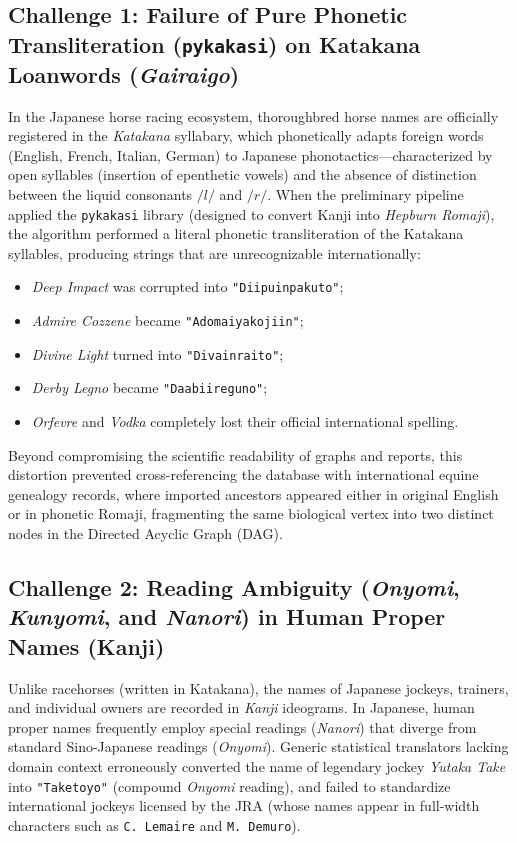 \documentclass[12pt,a4paper]{article}
\begin{document}
\subsection{Challenge 1: Failure of Pure Phonetic Transliteration (\texttt{pykakasi}) on Katakana Loanwords (\textit{Gairaigo})}
In the Japanese horse racing ecosystem, thoroughbred horse names are officially registered in the \textit{Katakana} syllabary, which phonetically adapts foreign words (English, French, Italian, German) to Japanese phonotactics---characterized by open syllables (insertion of epenthetic vowels) and the absence of distinction between the liquid consonants $/l/$ and $/r/$.
When the preliminary pipeline applied the \texttt{pykakasi} library (designed to convert Kanji into \textit{Hepburn Romaji}), the algorithm performed a literal phonetic transliteration of the Katakana syllables, producing strings that are unrecognizable internationally:
\begin{itemize}
    \item \textit{Deep Impact} was corrupted into \texttt{"Diipuinpakuto"};
    \item \textit{Admire Cozzene} became \texttt{"Adomaiyakojiin"};
    \item \textit{Divine Light} turned into \texttt{"Divainraito"};
    \item \textit{Derby Legno} became \texttt{"Daabiireguno"};
    \item \textit{Orfevre} and \textit{Vodka} completely lost their official international spelling.
\end{itemize}
Beyond compromising the scientific readability of graphs and reports, this distortion prevented cross-referencing the database with international equine genealogy records, where imported ancestors appeared either in original English or in phonetic Romaji, fragmenting the same biological vertex into two distinct nodes in the Directed Acyclic Graph (DAG).

\subsection{Challenge 2: Reading Ambiguity (\textit{Onyomi}, \textit{Kunyomi}, and \textit{Nanori}) in Human Proper Names (Kanji)}
Unlike racehorses (written in Katakana), the names of Japanese jockeys, trainers, and individual owners are recorded in \textit{Kanji} ideograms. In Japanese, human proper names frequently employ special readings (\textit{Nanori}) that diverge from standard Sino-Japanese readings (\textit{Onyomi}).
Generic statistical translators lacking domain context erroneously converted the name of legendary jockey \textit{Yutaka Take} into \texttt{"Taketoyo"} (compound \textit{Onyomi} reading), and failed to standardize international jockeys licensed by the JRA (whose names appear in full-width characters such as \texttt{C. Lemaire} and \texttt{M. Demuro}).
\end{document}
